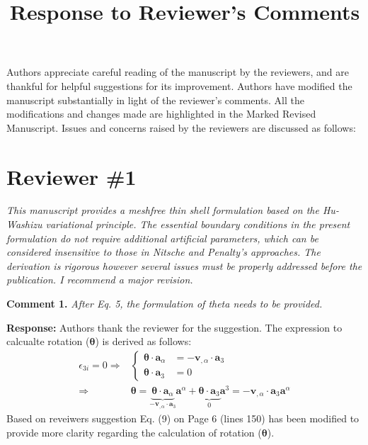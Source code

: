 \documentclass{article}
\title{Response to Reviewer's Comments}
\author{}
\date{}
\begin{document}
\maketitle

Authors appreciate careful reading of the manuscript by the reviewers, and are thankful for helpful suggestions for its improvement. Authors have modified the manuscript substantially in light of the reviewer's comments. All the modifications and changes made are highlighted in the Marked Revised Manuscript. Issues and concerns raised by the reviewers are discussed as follows:

\section*{Reviewer \#1}
\textit{This manuscript provides a meshfree thin shell formulation based on the Hu-Washizu variational principle. The essential boundary conditions in the present formulation do not require additional artificial parameters, which can be considered insensitive to those in Nitsche and Penalty’s approaches. The derivation is rigorous however several issues must be properly addressed before the publication. I recommend a major revision.}

\textbf{Comment 1.} \textit{After Eq. 5, the formulation of theta needs to be provided.}

\textbf{Response:} Authors thank the reviewer for the suggestion. The expression to calcualte rotation ($\boldsymbol \theta$) is derived as follows:
\begin{equation}
    \begin{split}
        \epsilon_{3i} = 0 \Rightarrow &
        \left \{
        \begin{split}
            \boldsymbol \theta \cdot \boldsymbol a_\alpha &= - \boldsymbol v_{,\alpha} \cdot \boldsymbol a_3 \\
            \boldsymbol \theta \cdot \boldsymbol a_3 &= 0
        \end{split}
        \right . \\ \Rightarrow &
        \boldsymbol \theta = \underbrace{\boldsymbol \theta \cdot \boldsymbol a_{\alpha}}_{- \boldsymbol v_{,\alpha} \cdot \boldsymbol a_3} \boldsymbol a^\alpha 
        + \underbrace{\boldsymbol \theta \cdot \boldsymbol a_3}_{0} \boldsymbol a^3 = - \boldsymbol v_{,\alpha} \cdot \boldsymbol a_3 \boldsymbol a^\alpha
    \end{split}
\end{equation}
Based on reveiwers suggestion Eq. (9) on Page 6 (lines 150) has been modified to provide more clarity regarding the calculation of rotation ($\boldsymbol \theta$).
\end{document}
